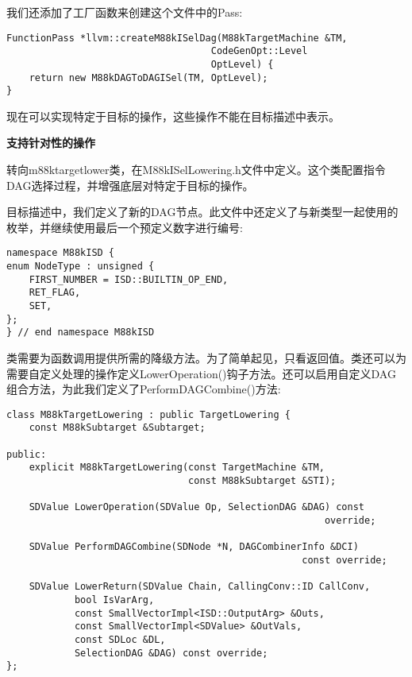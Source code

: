 我们还添加了工厂函数来创建这个文件中的Pass:\par

\begin{lstlisting}[caption={}]
FunctionPass *llvm::createM88kISelDag(M88kTargetMachine &TM,
									CodeGenOpt::Level
									OptLevel) {
	return new M88kDAGToDAGISel(TM, OptLevel);
}
\end{lstlisting}

现在可以实现特定于目标的操作，这些操作不能在目标描述中表示。\par

\hspace*{\fill} \par %
\textbf{支持针对性的操作}

转向m88ktargetlower类，在M88kISelLowering.h文件中定义。这个类配置指令DAG选择过程，并增强底层对特定于目标的操作。\par

目标描述中，我们定义了新的DAG节点。此文件中还定义了与新类型一起使用的枚举，并继续使用最后一个预定义数字进行编号:\par

\begin{lstlisting}[caption={}]
namespace M88kISD {
enum NodeType : unsigned {
	FIRST_NUMBER = ISD::BUILTIN_OP_END,
	RET_FLAG,
	SET,
};
} // end namespace M88kISD
\end{lstlisting}

类需要为函数调用提供所需的降级方法。为了简单起见，只看返回值。类还可以为需要自定义处理的操作定义LowerOperation()钩子方法。还可以启用自定义DAG组合方法，为此我们定义了PerformDAGCombine()方法:\par

\begin{lstlisting}[caption={}]
class M88kTargetLowering : public TargetLowering {
	const M88kSubtarget &Subtarget;
	
public:
	explicit M88kTargetLowering(const TargetMachine &TM,
								const M88kSubtarget &STI);
	
	SDValue LowerOperation(SDValue Op, SelectionDAG &DAG) const
														override;
	
	SDValue PerformDAGCombine(SDNode *N, DAGCombinerInfo &DCI)
													const override;
	
	SDValue LowerReturn(SDValue Chain, CallingConv::ID CallConv,
			bool IsVarArg,
			const SmallVectorImpl<ISD::OutputArg> &Outs,
			const SmallVectorImpl<SDValue> &OutVals,
			const SDLoc &DL,
			SelectionDAG &DAG) const override;
};
\end{lstlisting}

